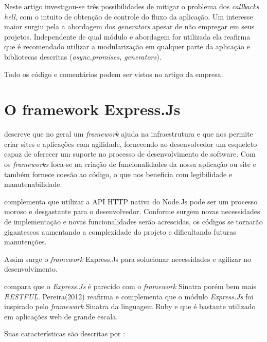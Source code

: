   Neste artigo \cite{Strongloop:2013} investigou-se três possibilidades de mitigar o problema dos \textit{callbacks hell}, com o 
  intuito de obtenção de controle do fluxo da aplicação. Um interesse maior surgiu pela a abordagem dos \textit{generators}
  apesar de não empregar em seus projetos. Independente de qual módulo e abordagem for utilizada ela reafirma que é recomendado
  utilizar a modularização em qualquer parte da aplicação e bibliotecas descritas (\textit{async,promises, generators}).
  
  Todo os código e comentários podem ser vistos no artigo da empresa. \cite{Strongloop:2013}
  

\section{O framework Express.Js}
\label{framework-express}

  \cite{Powers:2012} descreve que no geral um \textit{framework} ajuda na infraestrutura e que nos permite criar sites e aplicações
  com agilidade, fornecendo ao desenvolvedor um esqueleto capaz de oferecer um suporte no processo de desenvolvimento de
  software. Com os \textit{frameworks} foca-se na criação de funcionalidades da nossa aplicação ou site e 
  também fornece coesão ao código, o que nos beneficia com legibilidade e manutenabilidade.

  \cite{Pereira:2013} complementa que utilizar a API HTTP nativa do Node.Js pode ser um processo moroso e desgastante
  para o desenvolvedor. 
  Conforme surgem novas necessidades de implementação e novas funcionalidades serão acrescidas,
  os códigos se tornarão gigantescos aumentando a complexidade do projeto e dificultando futuras manutenções.
  
  Assim surge o \textit{framework} Express.Js para solucionar necessidades e agilizar no desenvolvimento.
  
   compara que o \textit{Express.Js} é parecido com o \textit{framework} Sinatra porém bem mais \textit{RESTFUL}. 
  Pereira(2012) reafirma e complementa que o módulo \textit{Express.Js} foi inspirado pelo \textit{framework} Sinatra da 
  linguagem Ruby e que é bastante utilizado em aplicações web de grande escala.
  
  Suas características são descritas por :
  
